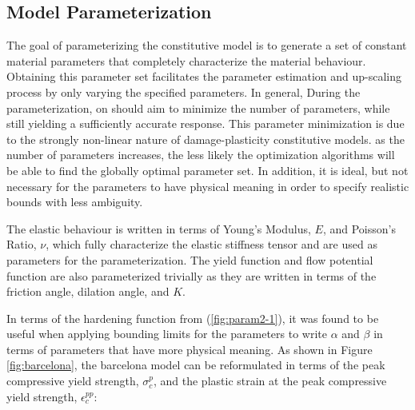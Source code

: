 \subsection{Model Parameterization}

The goal of parameterizing the constitutive model is to generate a set of constant material parameters that completely characterize the material behaviour. Obtaining this parameter set facilitates the parameter estimation and up-scaling process by only varying the specified parameters. In general, During the parameterization, on should aim to minimize the number of parameters, while still yielding a sufficiently accurate response. This parameter minimization is due to the strongly non-linear nature of damage-plasticity constitutive models. as the number of parameters increases, the less likely the optimization algorithms will be able to find the globally optimal parameter set. In addition, it is ideal, but not necessary for the parameters to have physical meaning in order to specify realistic bounds with less ambiguity.

The elastic behaviour is written in terms of Young's Modulus, $E$, and Poisson's Ratio, $\nu$, which fully characterize the elastic stiffness tensor and are used as parameters for the parameterization. The yield function and flow potential function are also parameterized trivially as they are written in terms of the friction angle, dilation angle, and $K$.

In terms of the hardening function from (\ref{fig:param2-1}), it was found to be useful when applying bounding limits for the parameters to write $\alpha$ and $\beta$ in terms of parameters that have more physical meaning.  As shown in Figure \ref{fig:barcelona}, the barcelona model can be reformulated in terms of the peak compressive yield strength, $\sigma_{c}^{p}$, and the plastic strain at the peak compressive yield strength, $\epsilon_c^{pp}$:
